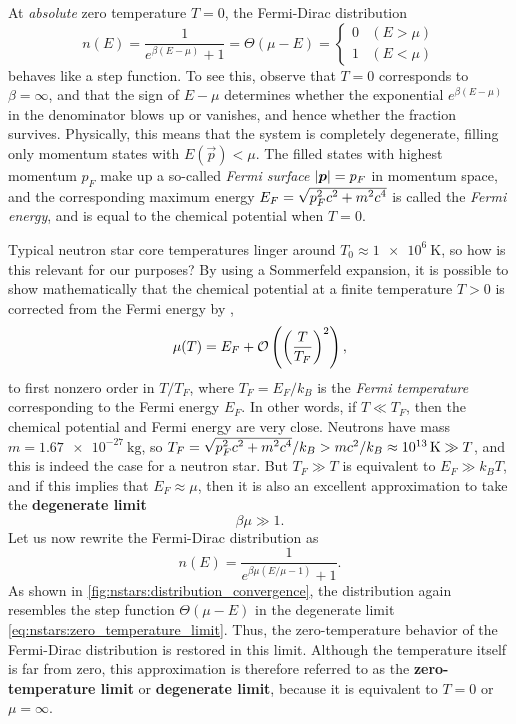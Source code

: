 At \emph{absolute} zero temperature $T = 0$, the Fermi-Dirac distribution
\begin{equation}
	n(E) = \frac{1}{e^{\beta (E - \mu)} + 1} = \Theta(\mu-E) = \begin{cases} 0 & (E > \mu) \\ 1 & (E < \mu) \end{cases}
\end{equation}
behaves like a step function.
To see this, observe that $T = 0$ corresponds to $\beta = \infty$, and that the sign of $E - \mu$ determines whether the exponential $e^{\beta (E - \mu)}$ in the denominator blows up or vanishes, and hence whether the fraction survives.
Physically, this means that the system is completely degenerate, filling only momentum states with $E(\vec{p}) < \mu$.
The filled states with highest momentum $p_F$ make up a so-called \emph{Fermi surface} $\left\lvert {\bm{p}} \right\rvert = p_F$ in momentum space, and the corresponding maximum energy $E_F = \sqrt{\smash[b]{p_F^2 c^2 + m^2 c^4}}$ is called the \emph{Fermi energy}, and is equal to the chemical potential when $T = 0$.

Typical neutron star core temperatures linger around $T_0 \approx \SI{1e6}{\kelvin}$, \cite{ref:glendenning} so how is this relevant for our purposes?
By using a Sommerfeld expansion, it is possible to show mathematically that the chemical potential at a finite temperature $T > 0$ is corrected from the Fermi energy by
\cite[section 3.6]{ref:notes_statistical_physics_tong}, \cite[exercise 2]{ref:eth_statistical_physics_exercise}
\begin{equation}
	\mu(T) = E_F + \mathcal{O} \left( \left( \frac{T}{T_F} \right)^2 \right) ,
\end{equation}
to first nonzero order in $T/T_F$, where $T_F = E_F / k_B$ is the \emph{Fermi temperature} corresponding to the Fermi energy $E_F$.
In other words, if $T \ll T_F$, then the chemical potential and Fermi energy are very close.
Neutrons have mass $m = \SI{1.67e-27}{\kilogram}$, so $T_F = \sqrt{\smash[b]{p_F^2 c^2 + m^2 c^4}} / k_B > m c^2 / k_B \approx \SI{1e13}{\kelvin} \gg T$, and this is indeed the case for a neutron star.
But $T_F \gg T$ is equivalent to $E_F \gg k_B T$, and if this implies that $E_F \approx \mu$, then it is also an excellent approximation to take the \textbf{degenerate limit}
\begin{equation}
	\beta \mu \gg 1 .
\label{eq:nstars:zero_temperature_limit}
\end{equation}
Let us now rewrite the Fermi-Dirac distribution as
\begin{equation}
	n(E) = \frac{1}{e^{\beta \mu (E/\mu - 1)} + 1} .
\end{equation}
As shown in \cref{fig:nstars:distribution_convergence}, the distribution again resembles the step function $\Theta(\mu - E)$ in the degenerate limit \eqref{eq:nstars:zero_temperature_limit}.
Thus, the zero-temperature behavior of the Fermi-Dirac distribution is restored in this limit.
Although the temperature itself is far from zero, this approximation is therefore referred to as the \textbf{zero-temperature limit} or \textbf{degenerate limit}, because it is equivalent to $T = 0$ or $\mu = \infty$.

